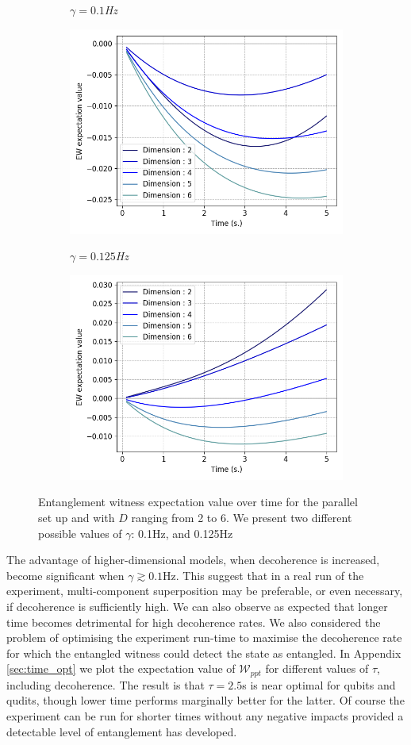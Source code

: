 \documentclass[%
 12pt,
 superscriptaddress,
 amsmath,
 amssymb,
 onecolumn,
 longbibliography
]{revtex4-2}
\begin{document}
	\begin{figure}
	    \begin{subfigure}{.49\textwidth}
	    	\textit{$\gamma = 0.1$Hz}\par\medskip
    		\includegraphics[width=.5\columnwidth]{EW_deco_time_01.png}\par\medskip
		\end{subfigure}
	    \begin{subfigure}{.49\textwidth}
	    	\textit{$\gamma = 0.125$Hz}\par\medskip
    		\includegraphics[width=.5\columnwidth]{EW_deco_time_0125.png}\par\medskip
		\end{subfigure}
	    \caption{Entanglement witness expectation value over time for the parallel set up and with $D$ ranging from 2 to 6. We present two different possible values of $\gamma$: 0.1Hz, and 0.125Hz}
	\end{figure}
\indent The advantage of higher-dimensional models, when decoherence is increased, become significant when $\gamma\gtrsim0.1$Hz. This suggest that in a real run of the experiment, multi-component superposition may be preferable, or even necessary, if decoherence is sufficiently high. We can also observe as expected that longer time becomes detrimental for high decoherence rates. We also considered the problem of optimising the experiment run-time to maximise the decoherence rate for which the entangled witness could detect the state as entangled. In Appendix \ref{sec:time_opt} we plot the expectation value of $\mathcal{W}_{ppt}$ for different values of $\tau$, including decoherence. The result is that $\tau=2.5$s is near optimal for qubits and qudits, though lower time performs marginally better for the latter. Of course the experiment can be run for shorter times without any negative impacts provided a detectable level of entanglement has developed. \\
\end{document}
